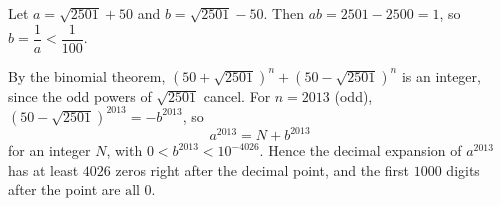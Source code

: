 Let $a=\sqrt{2501}+50$ and $b=\sqrt{2501}-50$. Then $ab=2501-2500=1$, so $b=\dfrac1a<\dfrac1{100}$.

By the binomial theorem, $\left(50+\sqrt{2501}\right)^n+\left(50-\sqrt{2501}\right)^n$ is an integer, since the odd powers of $\sqrt{2501}$ cancel. For $n=2013$ (odd), $\left(50-\sqrt{2501}\right)^{2013}=-b^{2013}$, so
\[a^{2013}=N+b^{2013}\]
for an integer $N$, with $0<b^{2013}<10^{-4026}$. Hence the decimal expansion of $a^{2013}$ has at least $4026$ zeros right after the decimal point, and the first $1000$ digits after the point are $\boxed{\text{all }0}$.
